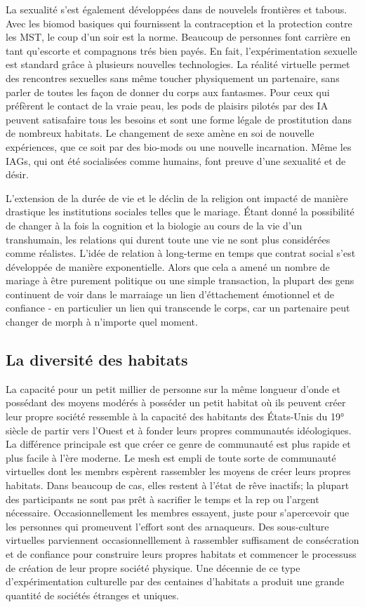       La sexualité s'est également développées dans de nouvelels frontières et tabous. Avec les biomod basiques qui fournissent la contraception et la protection contre les MST, le coup d'un soir est la norme. Beaucoup de personnes font carrière en tant qu'escorte et compagnons trés bien payés. En fait, l'expérimentation sexuelle est standard grâce à plusieurs nouvelles technologies. La réalité virtuelle permet des rencontres sexuelles sans même toucher physiquement un partenaire, sans parler de toutes les façon de donner du corps aux fantasmes. Pour ceux qui préfèrent le contact de la vraie peau, les pods de plaisirs pilotés par des IA peuvent satisafaire tous les besoins et sont une forme légale de prostitution dans de nombreux habitats. Le changement de sexe amène en soi de nouvelle expériences, que ce soit par des bio-mods ou une nouvelle incarnation. Même les IAGs, qui ont été socialisées comme humains, font preuve d'une sexualité et de désir. 

      L'extension de la durée de vie et le déclin de la religion ont impacté de manière drastique les institutions sociales telles que le mariage. Étant donné la possibilité de changer à la fois la cognition et la biologie au cours de la vie d'un transhumain, les relations qui durent toute une vie ne sont plus considérées comme réalistes. L'idée de relation à long-terme en temps que contrat social s'est développée de manière exponentielle. Alors que cela a amené un nombre de mariage à être purement politique ou une simple transaction, la plupart des gens continuent de voir dans le marraiage un lien d'éttachement émotionnel et de confiance - en particulier un lien qui transcende le corps, car un partenaire peut changer de morph à n'importe quel moment. 

      \subsection{La diversité des habitats} \label{sec:diversity-habitats} 

      La capacité pour un petit millier de personne sur la même longueur d'onde et possédant des moyens modérés à posséder un petit habitat où ils peuvent créer leur propre société ressemble à la capacité des habitants des États-Unis du 19° siècle de partir vers l'Ouest et à fonder leurs propres communautés idéologiques. La différence principale est que créer ce genre de communauté est plus rapide et plus facile à l'ère moderne. Le mesh est empli de toute sorte de communauté virtuelles dont les membrs espèrent rassembler les moyens de créer leurs propres habitats. Dans beaucoup de cas, elles restent à l'état de rêve inactifs; la plupart des participants ne sont pas prêt à sacrifier le temps et la rep ou l'argent nécessaire. Occasionnellement les membres essayent, juste pour s'apercevoir que les personnes qui promeuvent l'effort sont des arnaqueurs. Des sous-culture virtuelles parviennent occasionnelllement à rassembler suffisament de consécration et de confiance pour construire leurs propres habitats et commencer le processuss de création de leur propre société physique. Une décennie de ce type d'expérimentation culturelle par des centaines d'habitats a produit une grande quantité de sociétés étranges et uniques. 

